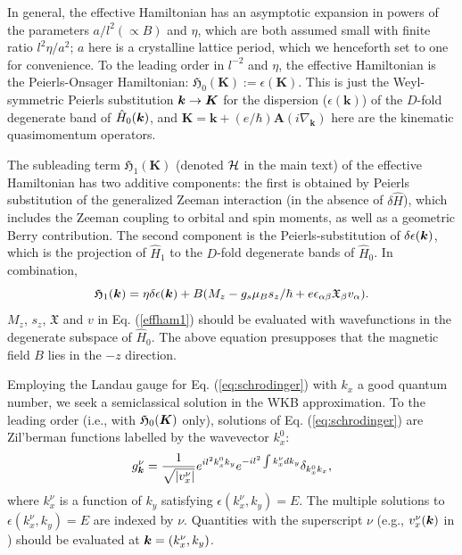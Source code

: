 \documentclass[aps, showpacs, twocolumn, notitlepage, superscriptaddress]{revtex4-1}
\begin{document}
In general, the effective Hamiltonian has an asymptotic expansion in powers of the  parameters $a/l^2 (\propto B)$ and $\eta$, which are both assumed small with finite ratio $l^2\eta/a^2$; $a$ here is a crystalline lattice period, which we henceforth set to one for convenience.
To the leading order in $l^{-2}$ and $\eta$, the effective Hamiltonian  is the Peierls-Onsager Hamiltonian: $\mathfrak{H}_{0}(\boldsymbol{K}):=\epsilon(\boldsymbol{K})$. This is just the Weyl-symmetric Peierls substitution $\boldsymbol{k} \rightarrow \boldsymbol{K}$ for the dispersion ($\epsilon(\boldsymbol{k})$) of the $D$-fold degenerate band of $\hat{H}_0(\boldsymbol{k})$, and $\boldsymbol{K}=\boldsymbol{k}+(e/\hbar)\boldsymbol{A}(i\nabla_{\boldsymbol{k}})$ here are the kinematic quasimomentum operators.

The subleading term $\mathfrak{H}_{1}(\boldsymbol{K})$ (denoted $\mathcal{H}$ in the main text) of the effective Hamiltonian has two additive components: the first is obtained by Peierls substitution of the generalized Zeeman interaction (in the absence of $\delta \hat{H}$), which includes the Zeeman coupling to orbital and spin moments, as well as a geometric Berry contribution. The second component is the Peierls-substitution of   $\delta \epsilon(\boldsymbol{k})$, which is the projection of $\hat{H}_1$ to the $D$-fold degenerate bands of $\hat{H}_0$. In combination,
\begin{equation}
\mathfrak{H}_1(\boldsymbol{k}) = \eta\delta \epsilon(\boldsymbol{k})+B(M_{z}-g_s\mu_{B}s_{z}/\hbar+e\epsilon_{\alpha\beta}\mathfrak{X}_{\beta}v_{\alpha}). \label{effham1}
\end{equation}
$M_z$, $s_z$, $\mathfrak{X}$ and $v$ in Eq. (\ref{effham1}) should be evaluated with wavefunctions in the degenerate subspace of $\hat{H}_0$. The above equation presupposes that the  magnetic field $B$ lies in the $-z$ direction.

Employing the Landau gauge for Eq. (\ref{eq:schrodinger}) with $k_x$ a good quantum number, we seek a semiclassical solution in the WKB approximation. To the leading order (i.e., with $\mathfrak{H}_0(\boldsymbol{K})$ only), solutions of Eq. (\ref{eq:schrodinger}) are Zil'berman functions\cite{zilberman} labelled by the wavevector $k_x^0$:
\begin{equation}
g_{\bk}^\nu=\frac{1}{\sqrt{|v_x^\nu|}}e^{il^2k_x^0k_y}e^{-il^{2}\int k_x^\nu dk_y}\delta_{k_x^0 k_x},\la{zilberman}
\end{equation}
where $k_x^\nu$ is a function of $k_y$ satisfying   $\epsilon(k_x^\nu,k_y)=E$. The multiple solutions to $\epsilon(k_x^\nu,k_y)=E$ are indexed by $\nu$. Quantities   with the superscript $\nu$ (e.g., $v_x^\nu(\boldsymbol{k})$ in ) should be evaluated at  $\boldsymbol{k} = (k_x^\nu, k_y)$.
\end{document}
